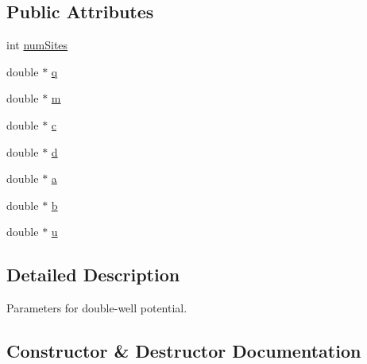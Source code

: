 \subsection*{Public Attributes}
\begin{DoxyCompactItemize}
\item 
int \hyperlink{class_p_c_a_1_1_polymer_energy_1_1_d_wparam_abec5b658b4c55c10b6b98ced9db46d03}{num\+Sites}
\item 
double $\ast$ \hyperlink{class_p_c_a_1_1_polymer_energy_1_1_d_wparam_aa81ddf89c6aeaeb56aa453206937fea0}{q}
\item 
double $\ast$ \hyperlink{class_p_c_a_1_1_polymer_energy_1_1_d_wparam_a2c7311aadb8e50991e81a7a356bf272a}{m}
\item 
double $\ast$ \hyperlink{class_p_c_a_1_1_polymer_energy_1_1_d_wparam_aba580654697b1b865d245c76be7ecafb}{c}
\item 
double $\ast$ \hyperlink{class_p_c_a_1_1_polymer_energy_1_1_d_wparam_abb53ce45fe1085b443b6070afb080373}{d}
\item 
double $\ast$ \hyperlink{class_p_c_a_1_1_polymer_energy_1_1_d_wparam_a04564ebaeb5a082c0aea0b184aa84faf}{a}
\item 
double $\ast$ \hyperlink{class_p_c_a_1_1_polymer_energy_1_1_d_wparam_a956852f19d2c08dd73b5a5b392d79bae}{b}
\item 
double $\ast$ \hyperlink{class_p_c_a_1_1_polymer_energy_1_1_d_wparam_af0c288045dda1bafb7bdea671a0cdf2a}{u}
\end{DoxyCompactItemize}


\subsection{Detailed Description}
Parameters for double-\/well potential. 

\subsection{Constructor \& Destructor Documentation}
\hypertarget{class_p_c_a_1_1_polymer_energy_1_1_d_wparam_a803a7fd6bcd83efd7934ad06a5fe6b71}{}\label{class_p_c_a_1_1_polymer_energy_1_1_d_wparam_a803a7fd6bcd83efd7934ad06a5fe6b71} 
